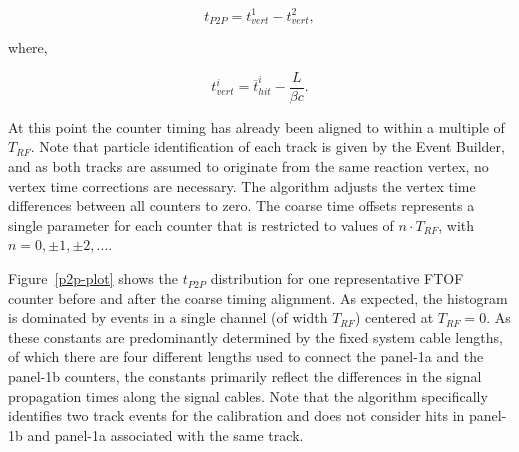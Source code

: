 \documentclass{elsart}
\begin{document}
\begin{equation}
t_{P2P} = t_{vert}^1 - t_{vert}^2,
\end{equation}

\noindent
where,

\begin{equation}
t_{vert}^i = \overline{t}_{hit}^i - \frac{L}{\beta c}.
\end{equation}

At this point the counter timing has already been aligned to within a multiple of $T_{RF}$. Note that
particle identification of each track is given by the Event Builder, and as both tracks are assumed to
originate from the same reaction vertex, no vertex time corrections are necessary. The algorithm
adjusts the vertex time differences between all counters to zero. The coarse time offsets represents
a single parameter for each counter that is restricted to values of $n \cdot T_{RF}$, with
$n = 0, \pm 1, \pm 2, ...$.

Figure~\ref{p2p-plot} shows the $t_{P2P}$ distribution for one representative FTOF counter before and
after the coarse timing alignment. As expected, the histogram is dominated by events in a single channel
(of width $T_{RF}$) centered at $T_{RF} = 0$. As these constants are predominantly determined by the
fixed system cable lengths, of which there are four different lengths used to connect the panel-1a and the
panel-1b counters, the constants primarily reflect the differences in the signal propagation times along
the signal cables. Note that the algorithm specifically identifies two track events for the calibration and
does not consider hits in panel-1b and panel-1a associated with the same track.
\end{document}
